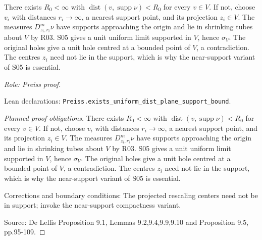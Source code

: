 \begin{lemma}
\label{lem:flat-infinity-bounded-holes}







There exists $R_0<\infty$ with
$\operatorname{dist}(v,\operatorname{supp}\nu)<R_0$ for every $v\in V$.
If not, choose $v_i$ with distances $r_i\to\infty$, a nearest support point,
and its projection $z_i\in V$. The measures $D^m_{z_i,r_i}\nu$ have
supports approaching the origin and lie in shrinking tubes about $V$ by R03.
S05 gives a unit uniform limit supported in $V$, hence $\sigma_V$.
The original holes give a unit hole centred at a bounded point of $V$, a
contradiction. The centres $z_i$ need not lie in the support, which is why the
near-support variant of S05 is essential.
\par\emph{Role: Preiss proof.}
\par Lean declarations: \texttt{Preiss.exists\_uniform\_dist\_plane\_support\_bound}.
\end{lemma}
\begin{proof}[Planned proof obligations]

There exists $R_0<\infty$ with
$\operatorname{dist}(v,\operatorname{supp}\nu)<R_0$ for every $v\in V$.
If not, choose $v_i$ with distances $r_i\to\infty$, a nearest support point,
and its projection $z_i\in V$. The measures $D^m_{z_i,r_i}\nu$ have
supports approaching the origin and lie in shrinking tubes about $V$ by R03.
S05 gives a unit uniform limit supported in $V$, hence $\sigma_V$.
The original holes give a unit hole centred at a bounded point of $V$, a
contradiction. The centres $z_i$ need not lie in the support, which is why the
near-support variant of S05 is essential.
\par Corrections and boundary conditions: The projected rescaling centers need not be in support; invoke the near-support compactness variant.
\par Source: De Lellis Proposition 9.1, Lemmas 9.2,9.4,9.9,9.10 and Proposition 9.5, pp.95-109.
\end{proof}

